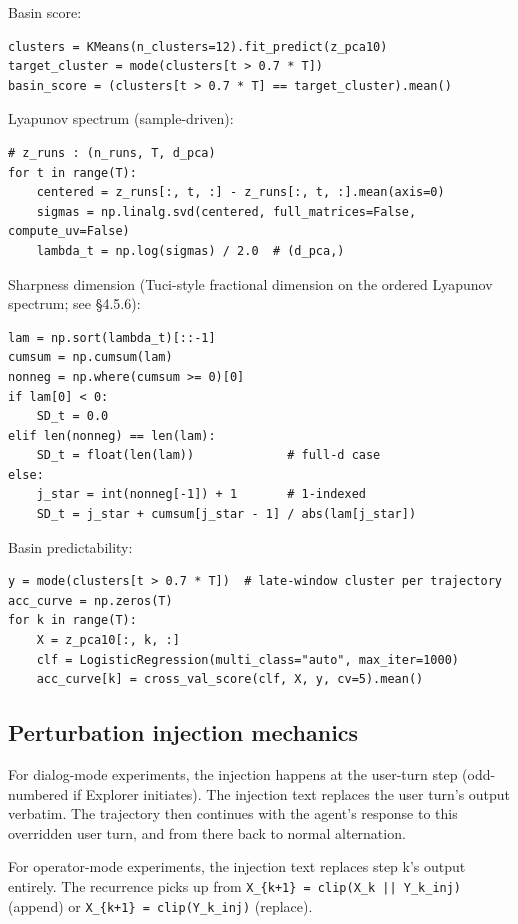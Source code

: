 \documentclass{article}
\theoremstyle{plain}
\theoremstyle{definition}
\begin{document}
Basin score:

\begin{verbatim}
clusters = KMeans(n_clusters=12).fit_predict(z_pca10)
target_cluster = mode(clusters[t > 0.7 * T])
basin_score = (clusters[t > 0.7 * T] == target_cluster).mean()
\end{verbatim}

Lyapunov spectrum (sample-driven):

\begin{verbatim}
# z_runs : (n_runs, T, d_pca)
for t in range(T):
    centered = z_runs[:, t, :] - z_runs[:, t, :].mean(axis=0)
    sigmas = np.linalg.svd(centered, full_matrices=False, compute_uv=False)
    lambda_t = np.log(sigmas) / 2.0  # (d_pca,)
\end{verbatim}

Sharpness dimension (Tuci-style fractional dimension on the ordered
Lyapunov spectrum; see §4.5.6):

\begin{verbatim}
lam = np.sort(lambda_t)[::-1]
cumsum = np.cumsum(lam)
nonneg = np.where(cumsum >= 0)[0]
if lam[0] < 0:
    SD_t = 0.0
elif len(nonneg) == len(lam):
    SD_t = float(len(lam))             # full-d case
else:
    j_star = int(nonneg[-1]) + 1       # 1-indexed
    SD_t = j_star + cumsum[j_star - 1] / abs(lam[j_star])
\end{verbatim}

Basin predictability:

\begin{verbatim}
y = mode(clusters[t > 0.7 * T])  # late-window cluster per trajectory
acc_curve = np.zeros(T)
for k in range(T):
    X = z_pca10[:, k, :]
    clf = LogisticRegression(multi_class="auto", max_iter=1000)
    acc_curve[k] = cross_val_score(clf, X, y, cv=5).mean()
\end{verbatim}

\subsection{Perturbation injection mechanics}

For dialog-mode experiments, the injection happens at the user-turn
step (odd-numbered if Explorer initiates). The injection text replaces
the user turn's output verbatim. The trajectory then continues with
the agent's response to this overridden user turn, and from there
back to normal alternation.

For operator-mode experiments, the injection text replaces step k's
output entirely. The recurrence picks up from \texttt{X\_\{k+1\} = clip(X\_k ||
Y\_k\_inj)} (append) or \texttt{X\_\{k+1\} = clip(Y\_k\_inj)} (replace).
\end{document}
